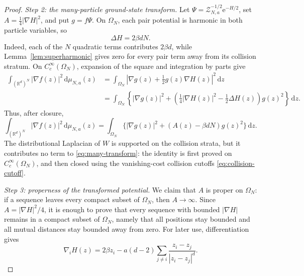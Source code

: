 \documentclass[12pt,reqno,letterpaper]{amsart}
\theoremstyle{definition}
\theoremstyle{remark}
\numberwithin{equation}{section}
\newcommand{\R}{\mathbb R}
\newcommand{\dd}{\,\mathrm d}
\newcommand{\ee}{\mathrm e}
\newcommand{\be}{\beta}
\begin{document}
\begin{proof}
\emph{Step 2: the many-particle ground-state transform.}
Let \(\Psi=\mathcal Z_{N,a}^{-1/2}\ee^{-H/2}\), set
\(A=\frac14|\nabla H|^2\), and put \(g=f\Psi\).  On
\(\Omega_N\), each pair potential is harmonic in both particle variables,
so
\begin{equation*}
 \Delta H=2\be dN.
\end{equation*}
Indeed, each of the \(N\) quadratic terms contributes \(2\be d\), while
Lemma~\ref{lem:superharmonic} gives zero for every pair term away from its
collision stratum.  On \(C_c^\infty(\Omega_N)\), expansion of the square and
integration by parts give
\begin{align*}
 \int_{(\R^d)^N}|\nabla f(z)|^2\dd\mu_{N,a}(z)
 &=\int_{\Omega_N}\left|\nabla g(z)+\tfrac12g(z)\nabla H(z)\right|^2\dd z\\
 &=\int_{\Omega_N}\left\{|\nabla g(z)|^2+
   \left(\tfrac14|\nabla H(z)|^2-\tfrac12\Delta H(z)\right)g(z)^2
   \right\}\dd z.
\end{align*}
Thus, after closure,
\begin{equation}
 \label{eq:many-transform}
 \int_{(\R^d)^N}|\nabla f(z)|^2\dd\mu_{N,a}(z)
 =\int_{\Omega_N}\{|\nabla g(z)|^2+(A(z)-\be dN)g(z)^2\}\dd z.
\end{equation}
The distributional Laplacian of \(W\) is supported on the collision strata,
but it contributes no term to \eqref{eq:many-transform}: the identity is
first proved on \(C_c^\infty(\Omega_N)\), and then closed using the
vanishing-cost collision cutoffs \eqref{eq:collision-cutoff}.

\emph{Step 3: properness of the transformed potential.}
We claim that \(A\) is proper on \(\Omega_N\): if a sequence leaves every
compact subset of \(\Omega_N\), then \(A\to\infty\).  Since
\(A=|\nabla H|^2/4\), it is enough to prove that every sequence with bounded
\(|\nabla H|\) remains in a compact subset of \(\Omega_N\), namely that all
positions stay bounded and all mutual distances stay bounded away from zero.
For later use, differentiation gives
\[
 \nabla_iH(z)
 =2\be z_i-a(d-2)\sum_{j\ne i}
   \frac{z_i-z_j}{|z_i-z_j|^d}.
\]


\end{proof}
\end{document}
